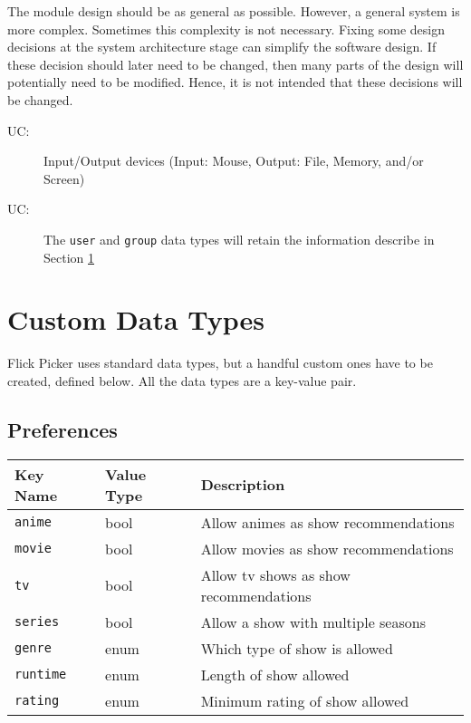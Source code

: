 \documentclass[12pt, titlepage]{article}
\newcounter{ucnum}
\newcommand{\uctheucnum}{UC\theucnum}
\begin{document}
The module design should be as general as possible. However, a general system is
more complex. Sometimes this complexity is not necessary. Fixing some design
decisions at the system architecture stage can simplify the software design. If
these decision should later need to be changed, then many parts of the design
will potentially need to be modified. Hence, it is not intended that these
decisions will be changed.

\begin{description}
\item[ \uctheucnum \label{ucIO}:] Input/Output devices (Input: Mouse, Output: File, Memory, and/or Screen)
\item[ \uctheucnum \label{ucCD}:] The \verb_user_ and \verb_group_ data types will retain the information describe in Section \ref{SecCD}
\end{description}

\section{Custom Data Types} \label{SecCD}
Flick Picker uses standard data types, but a handful custom ones have to be created, defined below. All the data types are a key-value pair.

\subsection{Preferences}
\begin{tabularx}{\textwidth}{|p{3.3cm}|p{3cm}|X|}
\hline
{\bf Key Name} & {\bf Value Type} & {\bf Description}\\
\hline
\verb_anime_ & bool & Allow animes as show recommendations\\
\hline
\verb_movie_ & bool & Allow movies as show recommendations\\
\hline
\verb_tv_ & bool & Allow tv shows as show recommendations\\
\hline
\verb_series_ & bool & Allow a show with multiple seasons\\
\hline
\verb_genre_ & enum & Which type of show is allowed\\
\hline
\verb_runtime_ & enum & Length of show allowed\\
\hline
\verb_rating_ & enum & Minimum rating of show allowed\\
\hline
\end{tabularx}
\end{document}

